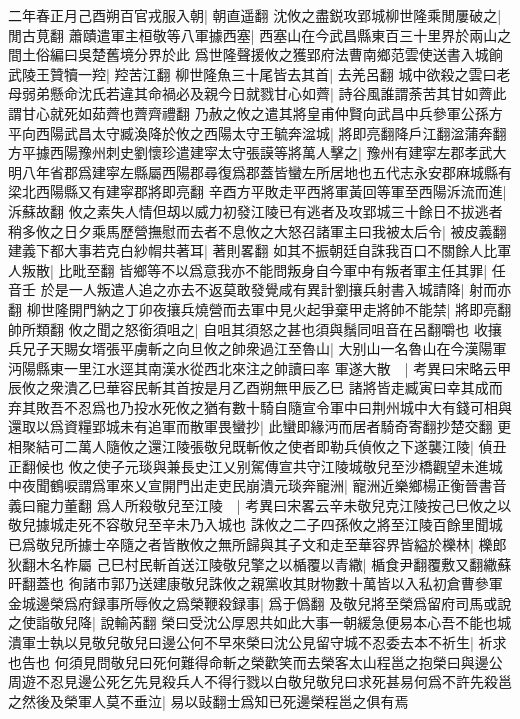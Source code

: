 二年春正月己酉朔百官戎服入朝|{
	朝直遥翻}
沈攸之盡鋭攻郢城柳世隆乘閒屢破之|{
	閒古莧翻}
蕭賾遣軍主桓敬等八軍據西塞|{
	西塞山在今武昌縣東百三十里界於兩山之間土俗編曰吳楚舊境分界於此}
爲世隆聲援攸之獲郢府法曹南鄉范雲使送書入城餉武陵王贊犢一羫|{
	羫苦江翻}
柳世隆魚三十尾皆去其首|{
	去羌呂翻}
城中欲殺之雲曰老母弱弟懸命沈氏若違其命禍必及親今日就戮甘心如薺|{
	詩谷風誰謂荼苦其甘如薺此謂甘心就死如茹薺也薺齊禮翻}
乃赦之攸之遣其將皇甫仲賢向武昌中兵參軍公孫方平向西陽武昌太守臧渙降於攸之西陽太守王毓奔湓城|{
	將即亮翻降戶江翻湓蒲奔翻}
方平據西陽豫州刺史劉懷珍遣建寜太守張謨等將萬人擊之|{
	豫州有建寜左郡孝武大明八年省郡爲建寜左縣屬西陽郡尋復爲郡蓋皆蠻左所居地也五代志永安郡麻城縣有梁北西陽縣又有建寜郡將即亮翻}
辛酉方平敗走平西將軍黃回等軍至西陽泝流而進|{
	泝蘇故翻}
攸之素失人情但刼以威力初發江陵已有逃者及攻郢城三十餘日不拔逃者稍多攸之日夕乘馬歷營撫慰而去者不息攸之大怒召諸軍主曰我被太后令|{
	被皮義翻}
建義下都大事若克白紗㡌共著耳|{
	著則畧翻}
如其不振朝廷自誅我百口不關餘人比軍人叛散|{
	比毗至翻}
皆鄉等不以爲意我亦不能問叛身自今軍中有叛者軍主任其罪|{
	任音壬}
於是一人叛遣人追之亦去不返莫敢發覺咸有異計劉攘兵射書入城請降|{
	射而亦翻}
柳世隆開門納之丁卯夜攘兵燒營而去軍中見火起爭棄甲走將帥不能禁|{
	將即亮翻帥所類翻}
攸之聞之怒銜須咀之|{
	自咀其須怒之甚也須與鬚同咀音在呂翻嚼也}
收攘兵兄子天賜女壻張平虜斬之向旦攸之帥衆過江至魯山|{
	大别山一名魯山在今漢陽軍沔陽縣東一里江水逕其南漢水從西北來注之帥讀曰率}
軍遂大散　|{
	考異曰宋略云甲辰攸之衆潰乙巳華容民斬其首按是月乙酉朔無甲辰乙巳}
諸將皆走臧寅曰幸其成而弃其敗吾不忍爲也乃投水死攸之猶有數十騎自隨宣令軍中曰荆州城中大有錢可相與還取以爲資糧郢城未有追軍而散軍畏蠻抄|{
	此蠻即緣沔而居者騎奇寄翻抄楚交翻}
更相聚結可二萬人隨攸之還江陵張敬兒既斬攸之使者即勒兵偵攸之下遂襲江陵|{
	偵丑正翻候也}
攸之使子元琰與兼長史江乂别駕傳宣共守江陵城敬兒至沙橋觀望未進城中夜聞鶴唳謂爲軍來乂宣開門出走吏民崩潰元琰奔寵洲|{
	寵洲近樂鄉楊正衡晉書音義曰寵力董翻}
爲人所殺敬兒至江陵　|{
	考異曰宋畧云辛未敬兒克江陵按己巳攸之以敬兒據城走死不容敬兒至辛未乃入城也}
誅攸之二子四孫攸之將至江陵百餘里聞城已爲敬兒所據士卒隨之者皆散攸之無所歸與其子文和走至華容界皆縊於櫟林|{
	櫟郎狄翻木名柞屬}
己巳村民斬首送江陵敬兒擎之以楯覆以青繖|{
	楯食尹翻覆敷又翻繖蘇旰翻蓋也}
徇諸市郭乃送建康敬兒誅攸之親黨收其財物數十萬皆以入私初倉曹參軍金城邊榮爲府録事所辱攸之爲榮鞭殺録事|{
	爲于僞翻}
及敬兒將至榮爲留府司馬或說之使詣敬兒降|{
	說輸芮翻}
榮曰受沈公厚恩共如此大事一朝緩急便易本心吾不能也城潰軍士執以見敬兒敬兒曰邊公何不早來榮曰沈公見留守城不忍委去本不祈生|{
	祈求也告也}
何須見問敬兒曰死何難得命斬之榮歡笑而去榮客太山程邕之抱榮曰與邊公周遊不忍見邊公死乞先見殺兵人不得行戮以白敬兒敬兒曰求死甚易何爲不許先殺邕之然後及榮軍人莫不垂泣|{
	易以䜴翻士爲知已死邊榮程邕之俱有焉}
